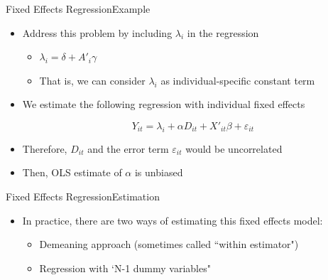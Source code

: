 \documentclass[dvipsnames,hyperref={pdfpagelabels=false}]{beamer}
\begin{document}
\begin{frame}{Fixed Effects Regression}{Example}
	\begin{itemize} 
		\item Address this problem by including $\lambda_i$ in the regression
					\vspace{0.2cm}
			\begin{itemize} 
		\item $\lambda_i=\delta+A'_i\gamma$
			\vspace{0.2cm}
		\item That is, we can consider $\lambda_i$ as individual-specific constant term	
			\end{itemize}
	
	\item We estimate the following regression with individual fixed effects
	
		\begin{equation}
		Y_{it}=\lambda_i+\alpha D_{it}+X'_{it}\beta + \varepsilon_{it}
	\end{equation}
		
		
		
		\item Therefore, $D_{it}$ and the error term $\varepsilon_{it}$ would be uncorrelated 
		\vspace{0.2cm}
		\item Then, OLS estimate of $\alpha$ is unbiased 
	
	\end{itemize}
\end{frame}







\begin{frame}{Fixed Effects Regression}{Estimation}
	\begin{itemize} 

		\item In practice, there are two ways of estimating this fixed effects model:
		\vspace{0.2cm}
		\begin{itemize}
			\item[1.] Demeaning approach (sometimes called ``within estimator")
			\vspace{0.2cm}
			\item[2.] Regression with `N-1 dummy variables"
		\end{itemize}
	\end{itemize}
\end{frame}
\end{document}
